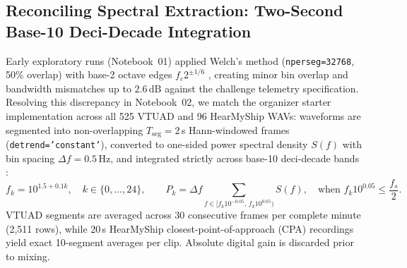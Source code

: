 \documentclass[10pt,a4paper]{article}
\begin{document}
\subsection{Reconciling Spectral Extraction: Two-Second Base-10 Deci-Decade Integration}
Early exploratory runs (Notebook~01) applied Welch's method (\texttt{nperseg=32768}, 50\% overlap) with base-2 octave edges $f_c 2^{\pm 1/6}$ \parencite{welch1967fft}, creating minor bin overlap and bandwidth mismatches up to 2.6\,dB against the challenge telemetry specification. Resolving this discrepancy in Notebook~02, we match the organizer starter implementation across all 525 VTUAD and 96 HearMyShip WAVs: waveforms are segmented into non-overlapping $T_{\mathrm{seg}}=2$\,s Hann-windowed frames (\texttt{detrend='constant'}), converted to one-sided power spectral density $S(f)$ with bin spacing $\Delta f = 0.5$\,Hz, and integrated strictly across base-10 deci-decade bands \parencite{zindi2026rules}:
\begin{equation}
\label{eq:decidecade}
f_k = 10^{1.5 + 0.1 k}, \quad k \in \{0,\dots,24\}, \qquad P_k = \Delta f \sum_{f \in [f_k 10^{-0.05},\, f_k 10^{0.05})} S(f), \quad \text{when } f_k 10^{0.05} \le \frac{f_s}{2}.
\end{equation}
VTUAD segments are averaged across 30 consecutive frames per complete minute (2,511 rows), while 20\,s HearMyShip closest-point-of-approach (CPA) recordings yield exact 10-segment averages per clip. Absolute digital gain is discarded prior to mixing.
\end{document}
